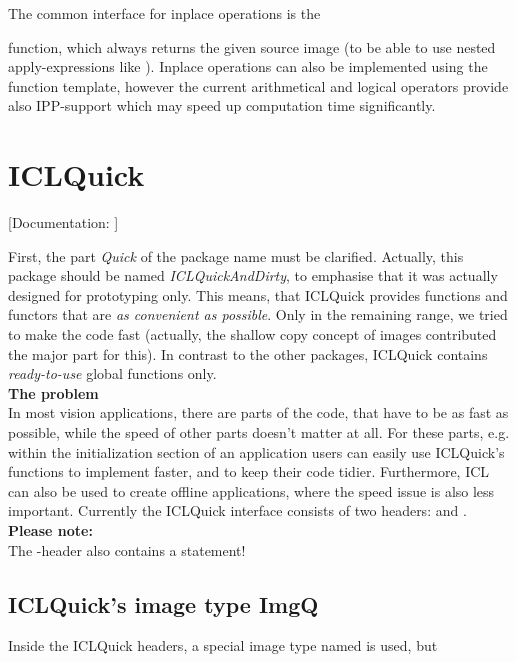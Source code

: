 The common interface for inplace operations is the


function, which always returns the given source image  (to be able to use nested apply-expressions like ). Inplace operations can also be implemented using the  function template, however the current arithmetical and logical operators provide also IPP-support which may speed up computation time significantly. 



\section{ICLQuick\label{sec:quick}}
[Documentation: ]

First, the part \emph{Quick} of the package name must be clarified. Actually, this package should be named \emph{ICLQuickAndDirty}, to emphasise that it was actually designed for prototyping only. This means, that ICLQuick provides functions and functors that are \emph{as convenient as possible}. Only in the remaining range, we tried to make the code fast (actually, the shallow copy concept of images contributed the major part for this). In contrast to the other packages, ICLQuick contains \emph{ready-to-use} global functions only.\\[10pt]
\textbf{The problem}\\
In most vision applications, there are parts of the code, that have to be as fast as possible, while the speed of other parts doesn't matter at all. For these parts, e.g. within the initialization section of an application users can easily use ICLQuick's functions to implement faster, and to keep their code tidier.
Furthermore, ICL can also be used to create offline applications, where the speed issue is also less important. Currently the ICLQuick interface consists of two headers:  and .\\[10pt]
\textbf{Please note:}\\
The -header also contains a 
statement!

\subsection{ICLQuick's image type ImgQ}
Inside the ICLQuick headers, a special image type named  is used, but\\

